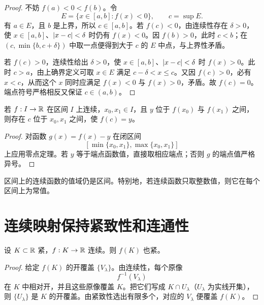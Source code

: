 \begin{proof}
不妨 \(f(a)<0<f(b)\)。令
\[
 E=\{x\in[a,b]:f(x)<0\},\qquad c=\sup E.
\]
有 \(a\in E\)，且 \(b\) 是上界，所以 \(c\in[a,b]\)。若 \(f(c)<0\)，由连续性存在 \(\delta>0\)，使 \(x\in[a,b]\)、\(\left|x-c\right|<\delta\) 时仍有 \(f(x)<0\)。因 \(f(b)>0\)，此时 \(c<b\)；在 \((c,\min\{b,c+\delta\})\) 中取一点便得到大于 \(c\) 的 \(E\) 中点，与上界性矛盾。

若 \(f(c)>0\)，连续性给出 \(\delta>0\)，使 \(x\in[a,b]\)、\(\left|x-c\right|<\delta\) 时 \(f(x)>0\)。此时 \(c>a\)，由上确界定义可取 \(x\in E\) 满足 \(c-\delta<x\le c\)。又因 \(f(c)>0\)，必有 \(x<c\)，从而这个 \(x\) 同时应满足 \(f(x)<0\) 与 \(f(x)>0\)，矛盾。故 \(f(c)=0\)。端点符号严格相反又保证 \(c\in(a,b)\)。
\end{proof}

\begin{theorem}[介值定理]
若 \(f:I\to\mathbb{R}\) 在区间 \(I\) 上连续，\(x_0,x_1\in I\)，且 \(y\) 位于 \(f(x_0)\) 与 \(f(x_1)\) 之间，则存在 \(c\) 位于 \(x_0,x_1\) 之间，使 \(f(c)=y\)。
\end{theorem}

\begin{proof}
对函数 \(g(x)=f(x)-y\) 在闭区间
\[
 [\min\{x_0,x_1\},\max\{x_0,x_1\}]
\]
上应用零点定理。若 \(y\) 等于端点函数值，直接取相应端点；否则 \(g\) 的端点值严格异号。
\end{proof}

\begin{corollary}
区间上的连续函数的值域仍是区间。特别地，若连续函数只取整数值，则它在每个区间上为常值。
\end{corollary}

\section{连续映射保持紧致性和连通性}

\begin{theorem}[连续像保持有限覆盖性质]
设 \(K\subset\mathbb{R}\) 紧，\(f:K\to\mathbb{R}\) 连续。则 \(f(K)\) 也紧。
\end{theorem}

\begin{proof}
给定 \(f(K)\) 的开覆盖 \(\{V_\lambda\}\)。由连续性，每个原像
\[
 f^{-1}(V_\lambda)
\]
在 \(K\) 中相对开，并且这些原像覆盖 \(K\)。把它们写成 \(K\cap U_\lambda\)（\(U_\lambda\) 为实线开集），则 \(\{U_\lambda\}\) 是 \(K\) 的开覆盖。由紧致性选出有限多个，对应的 \(V_\lambda\) 便覆盖 \(f(K)\)。
\end{proof}

